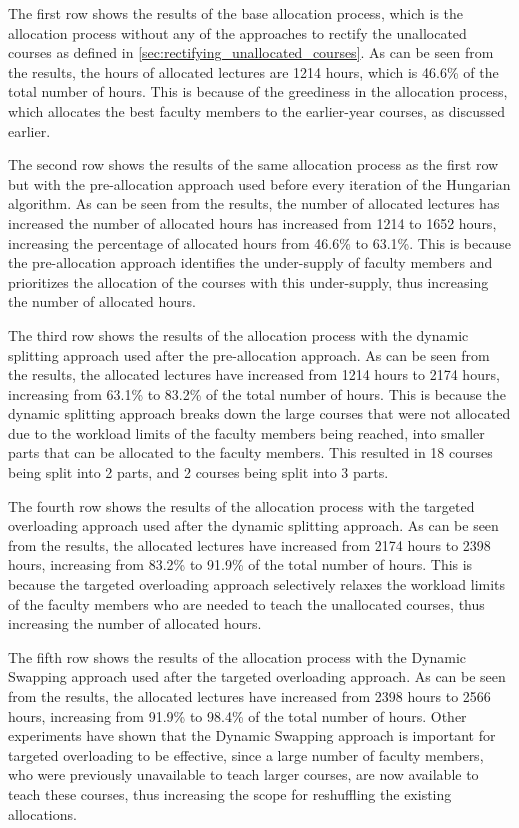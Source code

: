 The first row shows the results of the base allocation process, which is the allocation process without any of the approaches to rectify the unallocated courses as defined in  \autoref{sec:rectifying_unallocated_courses}. As can be seen from the results, the hours of allocated lectures are 1214 hours, which is 46.6\% of the total number of hours. This is because of the greediness in the allocation process, which allocates the best faculty members to the earlier-year courses, as discussed earlier.

The second row shows the results of the same allocation process as the first row but with the pre-allocation approach used before every iteration of the Hungarian algorithm. As can be seen from the results, the number of allocated lectures has increased the number of allocated hours has increased from 1214 to 1652 hours, increasing the percentage of allocated hours from 46.6\% to 63.1\%. This is because the pre-allocation approach identifies the under-supply of faculty members and prioritizes the allocation of the courses with this under-supply, thus increasing the number of allocated hours.

The third row shows the results of the allocation process with the dynamic splitting approach used after the pre-allocation approach. As can be seen from the results, the allocated lectures have increased from 1214 hours to 2174 hours, increasing from 63.1\% to 83.2\% of the total number of hours. This is because the dynamic splitting approach breaks down the large courses that were not allocated due to the workload limits of the faculty members being reached, into smaller parts that can be allocated to the faculty members. This resulted in 18 courses being split into 2 parts, and 2 courses being split into 3 parts.

The fourth row shows the results of the allocation process with the targeted overloading approach used after the dynamic splitting approach. As can be seen from the results, the allocated lectures have increased from 2174 hours to 2398 hours, increasing from 83.2\% to 91.9\% of the total number of hours. This is because the targeted overloading approach selectively relaxes the workload limits of the faculty members who are needed to teach the unallocated courses, thus increasing the number of allocated hours.

The fifth row shows the results of the allocation process with the Dynamic Swapping approach used after the targeted overloading approach. As can be seen from the results, the allocated lectures have increased from 2398 hours to 2566 hours, increasing from 91.9\% to 98.4\% of the total number of hours. Other experiments have shown that the Dynamic Swapping approach is important for targeted overloading to be effective, since a large number of faculty members, who were previously unavailable to teach larger courses, are now available to teach these courses, thus increasing the scope for reshuffling the existing allocations.


